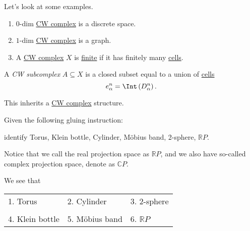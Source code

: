 \begin{eg}
	Let's look at some examples.
	\begin{enumerate}[(1)]
		\item \(0\)-dim \hyperref[def:CW-Complex]{CW complex} is a discrete space.
		\item \(1\)-dim \hyperref[def:CW-Complex]{CW complex} is a graph.
		\item A \hyperref[def:CW-Complex]{CW complex} \(X\) is \underline{finite} if it has finitely many \hyperref[def:cell]{cells}.
	\end{enumerate}
\end{eg}

\begin{definition}[CW subcomplex]\label{def:CW-subcomplex}
	A \emph{CW subcomplex} \(A\subseteq X\) is a closed subset equal to a union of \hyperref[def:cell]{cells}
	\[
		e^n_{\alpha} = \Int \left(D^n_{\alpha}\right).
	\]
\end{definition}
\begin{remark}
	This inherits a \hyperref[def:CW-Complex]{CW complex} structure.
\end{remark}

\begin{exercise}
	Given the following gluing instruction:
	\begin{center}
	\end{center}
	identify Torus, Klein bottle, Cylinder, Möbius band, 2-sphere, \(\mathbb{R} P\).
	\begin{notation}
		Notice that we call the real projection space as \(\mathbb{R} P\), and we also have so-called
		complex projection space, denote as \(\mathbb{C} P\).
	\end{notation}
\end{exercise}
\begin{answer}
	We see that
	\begin{table}[H]
		\centering
		\begin{tabular}{lll}
			1. Torus        & 2. Cylinder    & 3. 2-sphere                 \\\\
			4. Klein bottle & 5. Möbius band & 6.         \(\mathbb{R} P\) \\
		\end{tabular}
	\end{table}
\end{answer}

